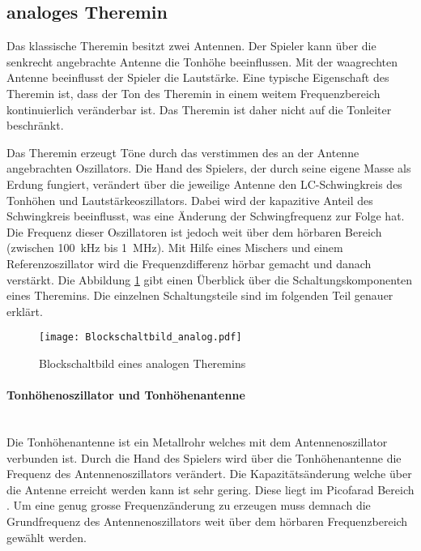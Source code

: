 \subsection{analoges Theremin}\label{subsec:Theremin_analog}
Das klassische Theremin besitzt zwei Antennen. Der Spieler kann über die senkrecht angebrachte Antenne  die  Tonhöhe beeinflussen. Mit der waagrechten Antenne beeinflusst der Spieler die Lautstärke. Eine typische Eigenschaft des Theremin ist, dass der Ton des Theremin in einem weitem Frequenzbereich kontinuierlich veränderbar ist. Das Theremin ist daher nicht auf die Tonleiter beschränkt.

Das Theremin erzeugt Töne durch das verstimmen des an der Antenne angebrachten Oszillators.
 Die Hand des Spielers, der durch seine eigene Masse als Erdung fungiert, verändert über die jeweilige Antenne den LC-Schwingkreis des Tonhöhen und Lautstärkeoszillators. Dabei wird der kapazitive Anteil des Schwingkreis beeinflusst, was eine Änderung der Schwingfrequenz zur Folge hat. 
 Die Frequenz dieser Oszillatoren ist jedoch weit über dem hörbaren Bereich (zwischen \SI{100}{kHz} bis \SI{1}{MHz}). Mit Hilfe eines Mischers und einem Referenzoszillator wird die Frequenzdifferenz hörbar gemacht und danach verstärkt\cite{Franzis}. Die Abbildung \ref{img:Blockschaltbild_analog} gibt einen Überblick über die Schaltungskomponenten eines Theremins. Die einzelnen Schaltungsteile sind im folgenden Teil genauer erklärt.

\begin{figure}[h]
	\centering
	\texttt{[image: Blockschaltbild\_analog.pdf]}
	\caption{Blockschaltbild eines analogen Theremins}
	\label{img:Blockschaltbild_analog}
\end{figure}

\paragraph{Tonhöhenoszillator und Tonhöhenantenne}\mbox{}
\\Die Tonhöhenantenne ist ein Metallrohr welches mit dem Antennenoszillator verbunden ist.
Durch die Hand des Spielers wird über die Tonhöhenantenne die Frequenz des Antennenoszillators verändert. Die Kapazitätsänderung welche über die Antenne erreicht werden kann ist sehr gering. Diese liegt im Picofarad Bereich \cite{physik_theremin}. Um eine genug grosse Frequenzänderung zu erzeugen muss demnach die Grundfrequenz des Antennenoszillators weit über dem hörbaren Frequenzbereich gewählt werden. 

